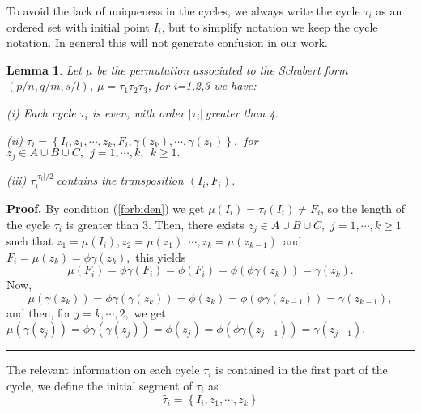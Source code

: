 \documentclass[12pt]{article}%
\newtheorem{lemma}[theorem]{Lemma}
\newenvironment{proof}[1][Proof]{\noindent\textbf{#1.} }{\ \rule{0.5em}{0.5em}}
\begin{document}
To avoid the lack of uniqueness in the cycles, we always write the cycle
$\tau_{i}$ as an ordered set with initial point $I_{i}$, but to simplify
notation we keep the cycle notation. In general this will not generate
confusion in our work.

\begin{lemma}
\label{lemcycle}Let $\mu$ be the permutation associated to the Schubert form
$(p/n,q/m,s/l)$, $\mu=\tau_{1}\tau_{2}\tau_{3}$, for i=1,2,3 we have:

(i) Each cycle $\tau_{i}$ is even, with order $\left\vert \tau_{i}\right\vert
\ $greater than 4.

(ii) $\tau_{i}=\left\{  I_{i},z_{1},\cdots,z_{k},F_{i},\gamma\left(
z_{k}\right)  ,\cdots,\gamma\left(  z_{1}\right)  \right\}  ,\ \ $for
$z_{j}\in A\cup B\cup C,\ \ j=1,\cdots,k,\ \ k\geq1.$

(iii) $\tau_{i}^{\left\vert \tau_{i}\right\vert /2}\ $contains the
transposition $\left(  I_{i},F_{i}\right)  $.
\end{lemma}

\begin{proof}
By condition (\ref{forbiden}) we get $\mu\left(  I_{i}\right)  =\tau
_{i}\left(  I_{i}\right)  \neq F_{i}$, so the length of the cycle $\tau_{i}$
is greater than 3. Then, there exists $z_{j}\in A\cup B\cup C,$ $j=1,\cdots
,k\geq1$ such that $z_{1}=\mu\left(  I_{i}\right)  ,z_{2}=\mu\left(
z_{1}\right)  ,\cdots,z_{k}=\mu\left(  z_{k-1}\right)  $\ and $F_{i}%
=\mu\left(  z_{k}\right)  =\phi\gamma\left(  z_{k}\right)  ,$ this yields%
\[
\mu\left(  F_{i}\right)  =\phi\gamma\left(  F_{i}\right)  =\phi\left(
F_{i}\right)  =\phi\left(  \phi\gamma\left(  z_{k}\right)  \right)
=\gamma\left(  z_{k}\right)  .
\]
Now,%
\[
\mu\left(  \gamma\left(  z_{k}\right)  \right)  =\phi\gamma\left(
\gamma\left(  z_{k}\right)  \right)  =\phi\left(  z_{k}\right)  =\phi\left(
\phi\gamma\left(  z_{k-1}\right)  \right)  =\gamma\left(  z_{k-1}\right)  ,
\]
and then, for $j=k,\cdots,2,$ we get $\mu\left(  \gamma\left(  z_{j}\right)
\right)  =\phi\gamma\left(  \gamma\left(  z_{j}\right)  \right)  =\phi\left(
z_{j}\right)  =\phi\left(  \phi\gamma\left(  z_{j-1}\right)  \right)
=\gamma\left(  z_{j-1}\right)  .$
\end{proof}

The relevant information on each cycle $\tau_{i}$ is contained in the first
part of the cycle, we define the initial segment of $\tau_{i}$ as%
\begin{equation}
\widetilde{\tau_{i}}=\left\{  I_{i},z_{1},\cdots,z_{k}\right\}
\label{defonda}%
\end{equation}
\end{document}
